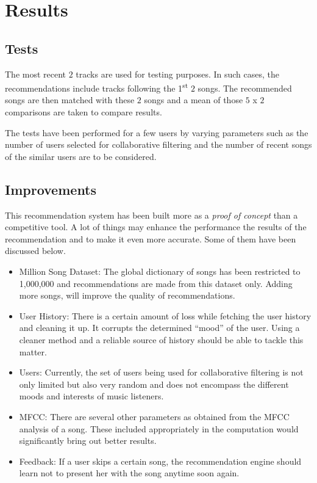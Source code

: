\chapter{Results}
	\section{Tests}
		The most recent \(2\) tracks are used for testing purposes. In such cases, the recommendations include tracks following the 1\textsuperscript{st} \(2\) songs. The recommended songs are then matched with these \(2\) songs and a mean of those \(5\) x \(2\) comparisons are taken to compare results.
		
		The tests have been performed for a few users by varying parameters such as the number of users selected for collaborative filtering and the number of recent songs of the similar users are to be considered.
	
	\section{Improvements}
		This recommendation system has been built more as a \emph{proof of concept} than a competitive tool. A lot of things may enhance the performance the results of the recommendation and to make it even more accurate. Some of them have been discussed below.

 \begin{itemize}
 	\item Million Song Dataset: The global dictionary of songs has been restricted to 1,000,000 and recommendations are made from this dataset only. Adding more songs, will improve the quality of recommendations.
 	\item User History: There is a certain amount of loss while fetching the user history and cleaning it up. It corrupts the determined ``mood'' of the user. Using a cleaner method and a reliable source of history should be able to tackle this matter.
 	\item Users: Currently, the set of users being used for collaborative filtering is not only limited but also very random and does not encompass the different moods and interests of music listeners.
 	\item MFCC: There are several other parameters as obtained from the MFCC analysis of a song. These included appropriately in the computation would significantly bring out better results.
 	\item Feedback: If a user skips a certain song, the recommendation engine should learn not to present her with the song anytime soon again.
 \end{itemize} 
	
